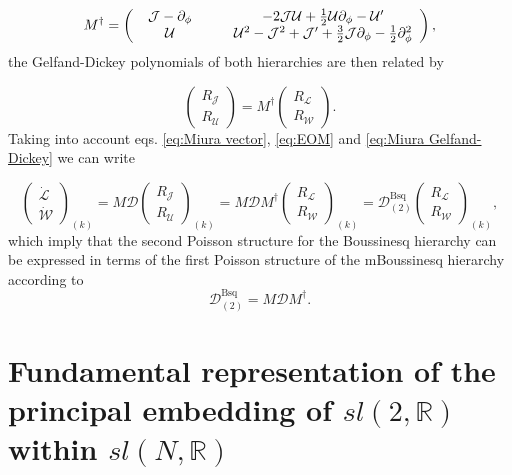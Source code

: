 \documentclass[letterpaper,11pt,oneside]{book}
\begin{document}
\[
M^{\dagger}=\left(\begin{array}{cc}
	\;\;{\cal J}-\partial_{\phi}\qquad & -2{\cal J}\mathcal{U}+\frac{1}{2}\mathcal{U}\partial_{\phi}-{\cal U}^{\prime}\\
	\;\;\mathcal{U}\qquad & \mathcal{U}^{2}-{\cal J}^{2}+{\cal J}^{\prime}+\frac{3}{2}{\cal J}\partial_{\phi}-\frac{1}{2}\partial_{\phi}^{2}
\end{array}\right),
\]
the Gelfand-Dickey polynomials of both hierarchies are then related
by

\begin{equation}
	\left(\begin{array}{c}
		R_{\mathcal{J}}\\
		R_{\mathcal{U}}
	\end{array}\right)=M^{\dagger}\left(\begin{array}{c}
		R_{\mathcal{L}}\\
		R_{\mathcal{W}}
	\end{array}\right).\label{eq:Miura Gelfand-Dickey}
\end{equation}
Taking into account eqs. \eqref{eq:Miura vector}, \eqref{eq:EOM}
and \eqref{eq:Miura Gelfand-Dickey} we can write

\[
\left(\begin{array}{c}
	\dot{\mathcal{L}}\\
	\dot{\mathcal{W}}
\end{array}\right)_{\left(k\right)}=M\mathcal{D}\left(\begin{array}{c}
	R_{\mathcal{J}}\\
	R_{\mathcal{U}}
\end{array}\right)_{\left(k\right)}=M\mathcal{D}M^{\dagger}\left(\begin{array}{c}
	R_{\mathcal{L}}\\
	R_{\mathcal{W}}
\end{array}\right)_{\left(k\right)}=\mathcal{D}_{(2)}^{\text{Bsq}}\left(\begin{array}{c}
	R_{\mathcal{L}}\\
	R_{\mathcal{W}}
\end{array}\right)_{\left(k\right)},
\]
which imply that the second Poisson structure for the Boussinesq hierarchy
can be expressed in terms of the first Poisson structure of the mBoussinesq
hierarchy according to
\[
\mathcal{D}_{(2)}^{\text{Bsq}}=M\mathcal{D}M^{\dagger}.
\]


\chapter{Fundamental representation of the principal embedding of $sl(2,\mathbb{R})$
	within $sl(N,\mathbb{R})$\label{Appendix 6: Fundamental rep}}
\end{document}
